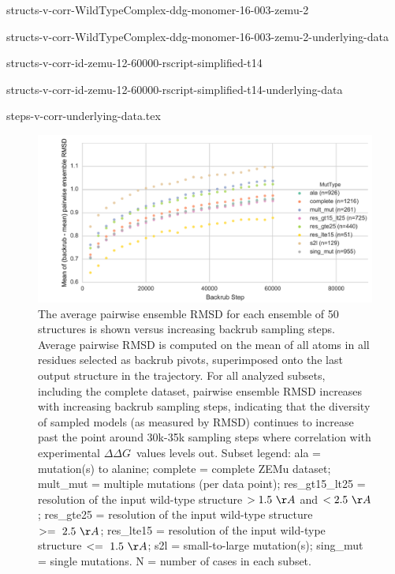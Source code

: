 \documentclass[journal=jpcbfk,manuscript=suppinfo]{achemso}
\newcommand\ddg{$\Delta\Delta G$}
\begin{document}
{structs-v-corr-WildTypeComplex-ddg-monomer-16-003-zemu-2}
\clearpage
\begin{landscape}
  {\small
    {structs-v-corr-WildTypeComplex-ddg-monomer-16-003-zemu-2-underlying-data}
  }
\end{landscape}
\clearpage

{structs-v-corr-id-zemu-12-60000-rscript-simplified-t14}
\clearpage
\begin{landscape}
  {\small
    {structs-v-corr-id-zemu-12-60000-rscript-simplified-t14-underlying-data}
  }
\end{landscape}
\clearpage

{\small
  {steps-v-corr-underlying-data.tex}
}

\begin{figure}
  \centering
  \includegraphics[width=\textwidth,keepaspectratio]{figures/t14-mean-ensemble-error.pdf}
  \caption{
    The average pairwise ensemble RMSD for each ensemble of 50 structures is shown versus increasing backrub sampling steps. Average pairwise RMSD is computed on the mean of all atoms in all residues selected as backrub pivots, superimposed onto the last output structure in the trajectory. For all analyzed subsets, including the complete dataset, pairwise ensemble RMSD increases with increasing backrub sampling steps, indicating that the diversity of sampled models (as measured by RMSD) continues to increase past the point around 30k-35k sampling steps where correlation with experimental \ddg\ values levels out. Subset legend: ala = mutation(s) to alanine; complete = complete ZEMu dataset; mult\_mut = multiple mutations (per data point); res\_gt15\_lt25 = resolution of the input wild-type structure $> 1.5\ \AA$ and $< 2.5\ \AA$; res\_gte25 = resolution of the input wild-type structure $>=\ 2.5\ \AA$; res\_lte15 = resolution of the input wild-type structure $<=\ 1.5\ \AA$; s2l = small-to-large mutation(s); sing\_mut = single mutations. N = number of cases in each subset.
  } \label{fig:t14-mean-ensemble}
\end{figure}
\end{document}
